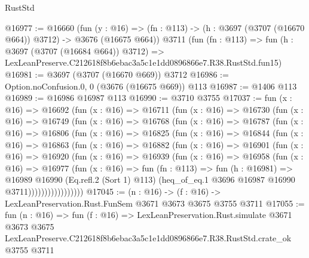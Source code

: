 \begin{lexlean}{RustStd}
\begin{coremodule}
@16977 := @16660
    (fun (y : @16) => (fn : @113) -> (h : @3697 (@3707 (@16670 @664)) @3712) -> @3676 (@16675 @664))
    @3711
    (fun (fn : @113) =>
    fun (h : @3697 (@3707 (@16684 @664)) @3712) =>
    LexLeanPreserve.C212618f8b6ebac3a5c1e1dd0896866e7.R38.RustStd.fun15)
@16981 := @3697 (@3707 (@16670 @669)) @3712
@16986 := Option.noConfusion.{0, 0} (@3676 (@16675 @669)) @113
@16987 := @1406 @113
@16989 := @16986 @16987 @113
@16990 := @3710 @3755
@17037 := fun (x : @16) =>
  @16692
    (fun (x : @16) =>
    @16711
      (fun (x : @16) =>
      @16730
        (fun (x : @16) =>
        @16749
          (fun (x : @16) =>
          @16768
            (fun (x : @16) =>
            @16787
              (fun (x : @16) =>
              @16806
                (fun (x : @16) =>
                @16825
                  (fun (x : @16) =>
                  @16844
                    (fun (x : @16) =>
                    @16863
                      (fun (x : @16) =>
                      @16882
                        (fun (x : @16) =>
                        @16901
                          (fun (x : @16) =>
                          @16920
                            (fun (x : @16) =>
                            @16939
                              (fun (x : @16) =>
                              @16958
                                (fun (x : @16) =>
                                @16977
                                  (fun (x : @16) =>
                                  fun (fn : @113) =>
                                  fun (h : @16981) =>
                                  @16989
                                    @16990
                                    (Eq.refl.{2} (Sort 1) @113)
                                    (heq_of_eq.{1} @3696 @16987 @16990 @3711)))))))))))))))))
@17045 := (n : @16) -> (f : @16) -> LexLeanPreservation.Rust.FunSem @3671 @3673 @3675 @3755 @3711
@17055 := fun (n : @16) =>
  fun (f : @16) =>
  LexLeanPreservation.Rust.simulate
    @3671
    @3673
    @3675
    LexLeanPreserve.C212618f8b6ebac3a5c1e1dd0896866e7.R38.RustStd.crate_ok
    @3755
    @3711
\end{coremodule}
\end{lexlean}
